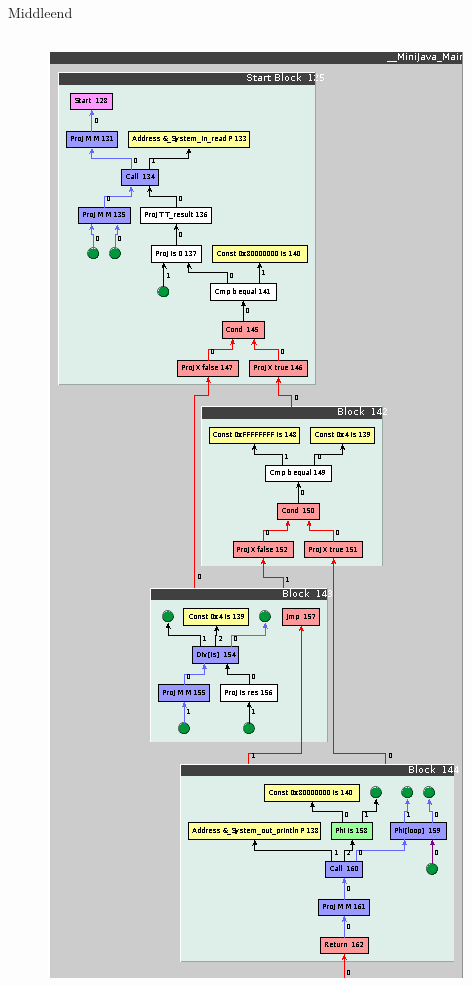 \documentclass[en,16:9]{sdqbeamer}
\begin{document}
\begin{frame}{Middleend}
\begin{columns}
		\begin{column}{0.25\linewidth}
			\vspace{-3em}
			\begin{figure}
				\centering
				\includegraphics[scale=0.3]{images/optimization-before.png}
			\end{figure}
		\end{column}


\end{columns}
\end{frame}
\end{document}
